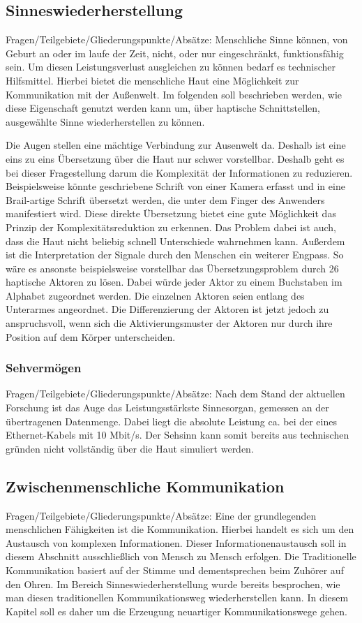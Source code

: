\documentclass{llncs}					%
\begin{document}
\subsection{Sinneswiederherstellung}
Fragen/Teilgebiete/Gliederungspunkte/Absätze:
Menschliche Sinne können, von Geburt an oder im laufe der Zeit, nicht, oder nur eingeschränkt, funktionsfähig sein. Um diesen Leistungsverlust ausgleichen zu können bedarf es technischer Hilfsmittel. Hierbei bietet die menschliche Haut eine Möglichkeit zur Kommunikation mit der Außenwelt. Im folgenden soll beschrieben werden, wie diese Eigenschaft genutzt werden kann um, über haptische Schnittstellen, ausgewählte Sinne wiederherstellen zu können.

Die Augen stellen eine mächtige Verbindung zur Ausenwelt da. Deshalb ist eine eins zu eins Übersetzung über die Haut nur schwer vorstellbar. Deshalb geht es bei dieser Fragestellung darum die Komplexität der Informationen zu reduzieren. Beispielsweise könnte geschriebene Schrift von einer Kamera erfasst und in eine Brail-artige Schrift übersetzt werden, die unter dem Finger des Anwenders manifestiert wird. Diese direkte Übersetzung bietet eine gute Möglichkeit das Prinzip der Komplexitätsreduktion zu erkennen. Das Problem dabei ist auch, dass die Haut nicht beliebig schnell Unterschiede wahrnehmen kann. Außerdem ist die Interpretation der Signale durch den Menschen ein weiterer Engpass. So wäre es ansonste beispielsweise vorstellbar das Übersetzungsproblem durch 26 haptische Aktoren zu lösen. Dabei würde jeder Aktor zu einem Buchstaben im Alphabet zugeordnet werden. Die einzelnen Aktoren seien entlang des Unterarmes angeordnet. Die Differenzierung der Aktoren ist jetzt jedoch zu anspruchsvoll, wenn sich die Aktivierungsmuster der Aktoren nur durch ihre Position auf dem Körper unterscheiden.

\subsubsection{Sehvermögen}
Fragen/Teilgebiete/Gliederungspunkte/Absätze:
Nach dem Stand der aktuellen Forschung ist das Auge das Leistungsstärkste Sinnesorgan, gemessen an der übertragenen Datenmenge\cite{Koch2006}. Dabei liegt die absolute Leistung ca. bei der eines Ethernet-Kabels mit 10 Mbit/s\cite{Koch2006}. Der Sehsinn kann somit bereits aus technischen gründen nicht vollständig über die Haut simuliert werden.
\subsection{Zwischenmenschliche Kommunikation}
Fragen/Teilgebiete/Gliederungspunkte/Absätze:
Eine der grundlegenden menschlichen Fähigkeiten ist die Kommunikation. Hierbei handelt es sich um den Austausch von komplexen Informationen. Dieser Informationenaustausch soll in diesem Abschnitt ausschließlich von Mensch zu Mensch erfolgen.
Die Traditionelle Kommunikation basiert auf der Stimme und dementsprechen beim Zuhörer auf den Ohren. Im Bereich Sinneswiederherstellung wurde bereits besprochen, wie man diesen traditionellen Kommunikationsweg wiederherstellen kann. In diesem Kapitel soll es daher um die Erzeugung neuartiger Kommunikationswege gehen.
\end{document}
